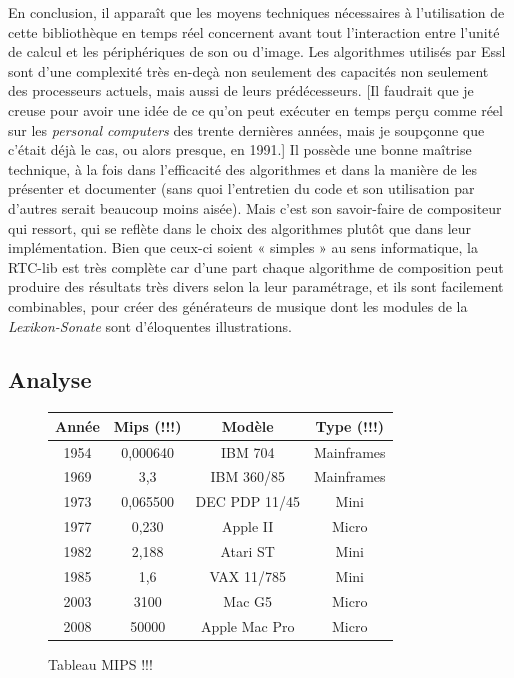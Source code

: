 \documentclass[a4paper,12pt]{article}
\begin{document}
En conclusion, il apparaît que les moyens techniques nécessaires à l'utilisation de cette bibliothèque en temps réel concernent avant tout l'interaction entre l'unité de calcul et les périphériques de son ou d'image. Les algorithmes utilisés par Essl sont d'une complexité très en-deçà non seulement des capacités non seulement des processeurs actuels, mais aussi de leurs prédécesseurs. [Il faudrait que je creuse pour avoir une idée de ce qu'on peut exécuter en temps perçu comme réel sur les \emph{personal computers} des trente dernières années, mais je soupçonne que c'était déjà le cas, ou alors presque, en 1991.] Il possède une bonne maîtrise technique, à la fois dans l'efficacité des algorithmes et dans la manière de les présenter et documenter (sans quoi l'entretien du code et son utilisation par d'autres serait beaucoup moins aisée). Mais c'est son savoir-faire de compositeur qui ressort, qui se reflète dans le choix des algorithmes plutôt que dans leur implémentation. Bien que ceux-ci soient « simples » au sens informatique, la RTC-lib est très complète car d'une part chaque algorithme de composition peut produire des résultats très divers selon la leur paramétrage, et ils sont facilement combinables, pour créer des générateurs de musique dont les modules de la \emph{Lexikon-Sonate} sont d'éloquentes illustrations.



\subsection{Analyse}



\begin{figure}
\begin{center}
\begin{tabular}{|c|c|c|c|}
\hline
\textbf{Année} & \textbf{Mips} (!!!) & \textbf{Modèle} & \textbf{Type} (!!!) \\
\hline
1954 & 0,000640 & IBM 704 & Mainframes \\
\hline
1969 & 3,3 & IBM 360/85 & Mainframes \\
\hline
1973 & 0,065500 & DEC PDP 11/45 & Mini \\
\hline
1977 & 0,230 & Apple II & Micro \\
\hline
1982 & 2,188 & Atari ST & Mini \\
\hline
1985 & 1,6 & VAX 11/785 & Mini \\
\hline
2003 & 3100 & Mac G5 & Micro \\
\hline
2008 & 50000 & Apple Mac Pro & Micro \\
\hline
\end{tabular}
\end{center}
\caption{Tableau MIPS !!!}
\label{tableaumips}
\end{figure}
\end{document}
